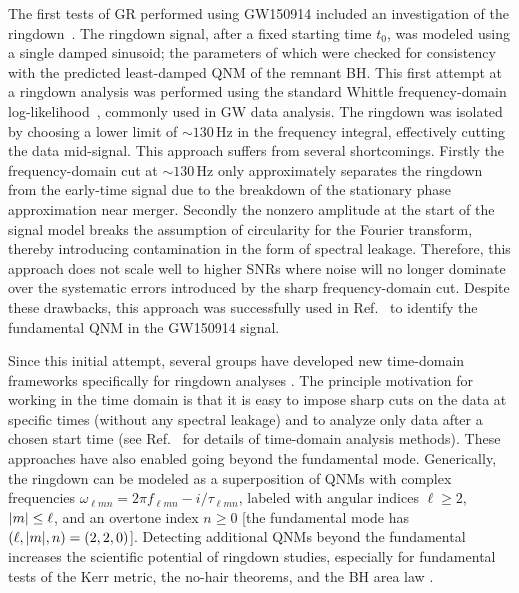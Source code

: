 The first tests of GR performed using GW150914 included an investigation of the ringdown~\cite{LIGOScientific:2016lio}. 
The ringdown signal, after a fixed starting time $t_0$, was modeled using a single damped sinusoid; the parameters of which were checked for consistency with the predicted least-damped QNM of the remnant BH.
This first attempt at a ringdown analysis was performed using the standard Whittle frequency-domain log-likelihood~\cite{Whittle:1957}, commonly used in GW data analysis.
The ringdown was isolated by choosing a lower limit of $\sim 130\, \mathrm{Hz}$ in the frequency integral, effectively cutting the data mid-signal.
This approach suffers from several shortcomings. 
Firstly the frequency-domain cut at $\sim 130\, \mathrm{Hz}$ only approximately separates the ringdown from the early-time signal due to the breakdown of the stationary phase approximation near merger. 
Secondly the nonzero amplitude at the start of the signal model breaks the assumption of circularity for the Fourier transform, thereby introducing contamination in the form of spectral leakage. 
Therefore, this approach does not scale well to higher SNRs where noise will no longer dominate over the systematic errors introduced by the sharp frequency-domain cut.
Despite these drawbacks, this approach was successfully used in Ref.~\cite{LIGOScientific:2016lio} to identify the fundamental QNM in the GW150914 signal.

Since this initial attempt, several groups have developed new time-domain frameworks specifically for ringdown analyses \cite{Carullo:2019flw, Isi:2019aib, Capano:2021etf}.
The principle motivation for working in the time domain is that it is easy to impose sharp cuts on the data at specific times (without any spectral leakage) and to analyze only data after a chosen start time (see Ref.~\cite{Isi:2021iql} for details of time-domain analysis methods).
These approaches have also enabled going beyond the fundamental mode. 
Generically, the ringdown can be modeled as a superposition of QNMs with complex frequencies $\omega_{\ell m n} = 2\pi f_{\ell m n} - i/\tau_{\ell m n}$, labeled with angular indices $\ell\geq 2$, $\abs{m}\leq\ell$, and an overtone index $n \geq 0$ [the fundamental mode has $(\ell, \abs{m}, n) = (2, 2, 0)$].
Detecting additional QNMs beyond the fundamental increases the scientific potential of ringdown studies, especially for fundamental tests of the Kerr metric, the no-hair theorems, and the BH area law \cite{Dreyer:2003bv, Berti:2005ys, Gossan:2011ha, Brito:2018rfr, Carullo:2019flw, Isi:2019aib, Isi:2020tac}.

